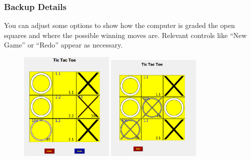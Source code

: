 \documentclass{beamer}
\begin{document}
\begin{frame}
	\frametitle{Backup Details}
	You can adjust some options to show how the computer is graded the open squares and where the possible winning moves are.  Relevant controls like ``New Game'' or ``Redo'' appear as necessary.
	\begin{figure}
		\centering
		\includegraphics[width=0.4\textwidth]{TicTacToe_Best_moves1.png} \quad%
		\includegraphics[width=0.4\textwidth]{TicTacToe_Best_moves2.png}
	\end{figure}
\end{frame}
\end{document}
